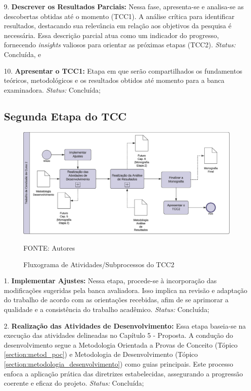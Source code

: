 9. \textbf{Descrever os Resultados Parciais:} Nessa fase, apresenta-se e analisa-se as descobertas obtidas até o momento (TCC1). A análise crítica para identificar 
resultados, destacando sua relevância em relação aos objetivos da pesquisa é necessária. Essa descrição parcial atua como um indicador do progresso, 
fornecendo \textit{insights} valiosos para orientar as próximas etapas (TCC2).
\textit{Status:} Concluída, e

10. \textbf{Apresentar o TCC1:} Etapa em que serão compartilhados os fundamentos teóricos, metodológicos e os resultados obtidos até momento para a banca examinadora.
\textit{Status:} Concluída;

\subsection{Segunda Etapa do TCC}

\begin{figure}[h]
	\centering
    \caption{Fluxograma de Atividades/Subprocessos do TCC2}
	\includegraphics[keepaspectratio=true,scale=0.45]{figuras/fluxograma_atividades_tcc2.eps}
	\parbox{\linewidth}{\centering FONTE: Autores}
	\label{fluxograma_atividades_tcc2}
\end{figure}

1. \textbf{Implementar Ajustes:} Nessa etapa, procede-se à incorporação das modificações sugeridas pela banca avaliadora. Isso implica na revisão e adaptação do 
trabalho de acordo com as orientações recebidas, afim de se aprimorar a qualidade e a consistência do trabalho acadêmico. 
\textit{Status:} Concluída;

2. \textbf{Realização das Atividades de Desenvolvimento:} Essa etapa baseia-se na execução das atividades delineadas no Capítulo 5 - Proposta. A condução do 
desenvolvimento segue a Metodologia Orientada a Provas de Conceito (Tópico \ref{section:metod_poc}) e Metodologia de Desenvolvimento 
(Tópico \ref{section:metodologia_desenvolvimento}) como guias principais. Este processo enfoca a aplicação prática das diretrizes estabelecidas, 
assegurando a progressão coerente e eficaz do projeto.
\textit{Status:} Concluída;

